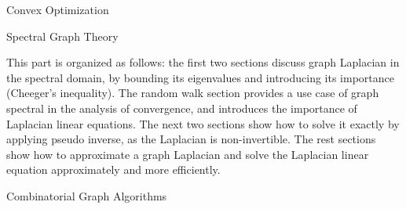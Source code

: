 \documentclass[11pt,landscape,a4paper]{article}
\newcommand{\HEADER}[1]{\begin{tcolorbox}
    \centering
    #1
\end{tcolorbox}}
\begin{document}
\small
\begin{multicols*}{3}


\HEADER{Convex Optimization}


\HEADER{Spectral Graph Theory}

This part is organized as follows: the first two sections discuss graph Laplacian in the spectral domain, by bounding its eigenvalues and introducing its importance (Cheeger's inequality). The random walk section provides a use case of graph spectral in the analysis of convergence, and introduces the importance of Laplacian linear equations. The next two sections show how to solve it exactly by applying pseudo inverse, as the Laplacian is non-invertible. The rest sections show how to approximate a graph Laplacian and solve the Laplacian linear equation approximately and more efficiently. 
















\HEADER{Combinatorial Graph Algorithms}







\end{multicols*}
\end{document}
